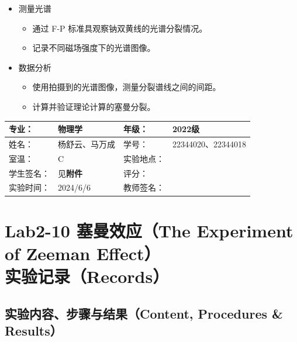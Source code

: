 \documentclass[dvipsnames, svgnames,a4paper,11pt]{article}
\begin{document}
\begin{enumerate}
\begin{itemize}
			\item 测量光谱
			\begin{itemize}
				\item 通过 F-P 标准具观察钠双黄线的光谱分裂情况。
				\item 记录不同磁场强度下的光谱图像。
			\end{itemize}
			
			\item 数据分析
			\begin{itemize}
				\item 使用拍摄到的光谱图像，测量分裂谱线之间的间距。
				\item 计算并验证理论计算的塞曼分裂。
			\end{itemize}
		\end{itemize}
		
	\end{enumerate}
	
	
	
	
	
	\clearpage
	
	\begin{table}
		\renewcommand\arraystretch{1.7}
		\centering
		\begin{tabularx}{\textwidth}{|X|X|X|X|}
			\hline
			专业： & 物理学 & 年级： & 2022级 \\
			\hline
			姓名： & 杨舒云、马万成 & 学号： & 22344020、22344018\\
			\hline
			室温： & \degree C & 实验地点： &  \\
			\hline
			学生签名：& 见\textbf{附件} & 评分： &\\
			\hline
			实验时间：& 2024/6/6 & 教师签名：&\\
			\hline
		\end{tabularx}
	\end{table}
	
	\section{Lab2-10 塞曼效应（The Experiment of Zeeman Effect）\\ \quad\heiti 实验记录（Records）}
	
	\subsection{实验内容、步骤与结果（Content, Procedures \& Results）}
	
\end{document}
